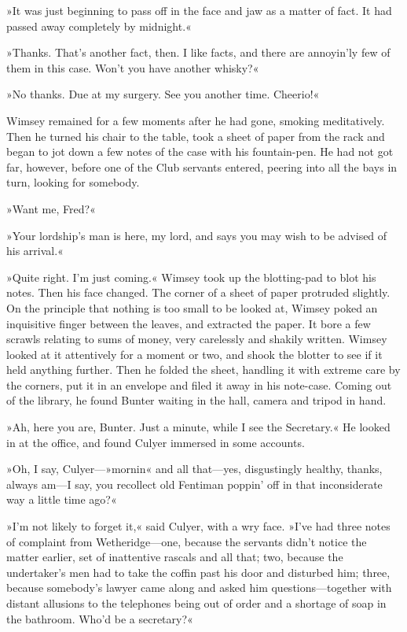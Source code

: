 »It was just beginning to pass off in the face and jaw as a matter of fact. It had passed away completely by midnight.«

»Thanks. That's another fact, then. I like facts, and there are annoyin'ly few of them in this case. Won't you have another whisky?«

»No thanks. Due at my surgery. See you another time. Cheerio!«

Wimsey remained for a few moments after he had gone, smoking meditatively. Then he turned his chair to the table, took a sheet of paper from the rack and began to jot down a few notes of the case with his fountain-pen. He had not got far, however, before one of the Club servants entered, peering into all the bays in turn, looking for somebody.

»Want me, Fred?«

»Your lordship's man is here, my lord, and says you may wish to be advised of his arrival.«

»Quite right. I'm just coming.« Wimsey took up the blotting-pad to blot his notes. Then his face changed. The corner of a sheet of paper protruded slightly. On the principle that nothing is too small to be looked at, Wimsey poked an inquisitive finger between the leaves, and extracted the paper. It bore a few scrawls relating to sums of money, very carelessly and shakily written. Wimsey looked at it attentively for a moment or two, and shook the blotter to see if it held anything further. Then he folded the sheet, handling it with extreme care by the corners, put it in an envelope and filed it away in his note-case. Coming out of the library, he found Bunter waiting in the hall, camera and tripod in hand.

»Ah, here you are, Bunter. Just a minute, while I see the Secretary.« He looked in at the office, and found Culyer immersed in some accounts.

»Oh, I say, Culyer---»mornin« and all that\allowbreak---\allowbreak yes, disgustingly healthy, thanks, always am\allowbreak---\allowbreak I say, you recollect old Fentiman poppin' off in that inconsiderate way a little time ago?«

»I'm not likely to forget it,« said Culyer, with a wry face. »I've had three notes of complaint from Wetheridge\allowbreak---\allowbreak one, because the servants didn't notice the matter earlier, set of inattentive rascals and all that; two, because the undertaker's men had to take the coffin past his door and disturbed him; three, because somebody's lawyer came along and asked him questions\allowbreak---\allowbreak together with distant allusions to the telephones being out of order and a shortage of soap in the bathroom. Who'd be a secretary?«

